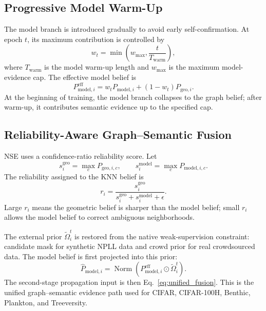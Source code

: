 \subsection{Progressive Model Warm-Up}
The model branch is introduced gradually to avoid early self-confirmation. At
epoch $t$, its maximum contribution is controlled by
\begin{equation}
    w_t =
    \min\left(w_{\max},\frac{t}{T_{\mathrm{warm}}}\right),
    \label{eq:model_warmup}
\end{equation}
where $T_{\mathrm{warm}}$ is the model warm-up length and $w_{\max}$ is the
maximum model-evidence cap. The effective model belief is
\begin{equation}
    P^{\mathrm{eff}}_{\mathrm{model},i}
    =
    w_t P_{\mathrm{model},i}
    +(1-w_t)P_{\mathrm{geo},i}.
    \label{eq:model_effective}
\end{equation}
At the beginning of training, the model branch collapses to the graph belief;
after warm-up, it contributes semantic evidence up to the specified cap.

\subsection{Reliability-Aware Graph--Semantic Fusion}
NSE uses a confidence-ratio reliability score. Let
\begin{equation}
    s_i^{\mathrm{geo}} = \max_c P_{\mathrm{geo},i,c},
    \qquad
    s_i^{\mathrm{model}} = \max_c P_{\mathrm{model},i,c}.
\end{equation}
The reliability assigned to the KNN belief is
\begin{equation}
    r_i =
    \frac{s_i^{\mathrm{geo}}}
    {s_i^{\mathrm{geo}}+s_i^{\mathrm{model}}+\epsilon}.
    \label{eq:ri_confidence}
\end{equation}
Large $r_i$ means the geometric belief is sharper than the model belief; small
$r_i$ allows the model belief to correct ambiguous neighborhoods.

The external prior $\tilde{\Omega}_i^t$ is restored from the native
weak-supervision constraint: candidate mask for synthetic NPLL data and crowd
prior for real crowdsourced data. The model belief is first projected into this
prior:
\begin{equation}
    \hat{P}_{\mathrm{model},i}
    =
    \operatorname{Norm}
    \left(P^{\mathrm{eff}}_{\mathrm{model},i}\odot\tilde{\Omega}_i^t\right).
    \label{eq:prior_effective}
\end{equation}
The second-stage propagation input is then Eq.~\eqref{eq:unified_fusion}. This
is the unified graph--semantic evidence path used for CIFAR, CIFAR-100H,
Benthic, Plankton, and Treeversity.

